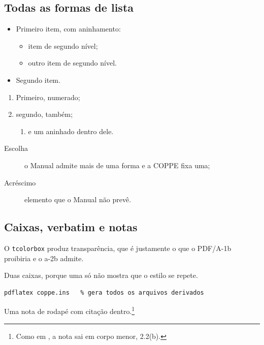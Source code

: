 \documentclass[dsc,pdfa,coorientador,numbers,twoside,orientadorexamina]{coppe}
\begin{document}
  \subsection{Todas as formas de lista}
  \begin{itemize}
    \item Primeiro item, com aninhamento:
    \begin{itemize}
      \item item de segundo nível;
      \item outro item de segundo nível.
    \end{itemize}
    \item Segundo item.
  \end{itemize}
  \begin{enumerate}
    \item Primeiro, numerado;
    \item segundo, também;
    \begin{enumerate}
      \item e um aninhado dentro dele.
    \end{enumerate}
  \end{enumerate}
  \begin{description}
    \item[Escolha] o Manual admite mais de uma forma e a COPPE fixa uma;
    \item[Acréscimo] elemento que o Manual não prevê.
  \end{description}

  \subsection{Caixas, verbatim e notas}
  \begin{tcolorbox}[title=Uma caixa com título]
    O \texttt{tcolorbox} produz transparência, que é justamente o que o
    PDF/A-1b proibiria e o a-2b admite.
  \end{tcolorbox}
  \begin{tcolorbox}[colback=white,colframe=black,title=Uma segunda caixa]
    Duas caixas, porque uma só não mostra que o estilo se repete.
  \end{tcolorbox}
  \begin{Verbatim}[frame=single]
  pdflatex coppe.ins   % gera todos os arquivos derivados
  \end{Verbatim}
  Uma nota de rodapé com citação dentro.\footnote{Como em
  \citet{m-norma}, a nota sai em corpo menor, 2.2(b).}
\end{document}
